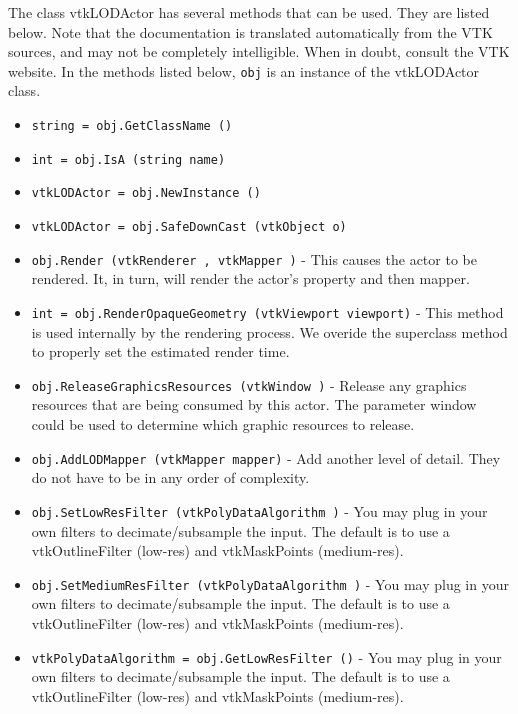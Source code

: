 The class vtkLODActor has several methods that can be used.
  They are listed below.
Note that the documentation is translated automatically from the VTK sources,
and may not be completely intelligible.  When in doubt, consult the VTK website.
In the methods listed below, \verb|obj| is an instance of the vtkLODActor class.
\begin{itemize}
\item  \verb|string = obj.GetClassName ()|

\item  \verb|int = obj.IsA (string name)|

\item  \verb|vtkLODActor = obj.NewInstance ()|

\item  \verb|vtkLODActor = obj.SafeDownCast (vtkObject o)|

\item  \verb|obj.Render (vtkRenderer , vtkMapper )| -  This causes the actor to be rendered. It, in turn, will render the actor's
 property and then mapper.  

\item  \verb|int = obj.RenderOpaqueGeometry (vtkViewport viewport)| -  This method is used internally by the rendering process. We overide 
 the superclass method to properly set the estimated render time.

\item  \verb|obj.ReleaseGraphicsResources (vtkWindow )| -  Release any graphics resources that are being consumed by this actor.
 The parameter window could be used to determine which graphic
 resources to release.

\item  \verb|obj.AddLODMapper (vtkMapper mapper)| -  Add another level of detail.  They do not have to be in any order
 of complexity.

\item  \verb|obj.SetLowResFilter (vtkPolyDataAlgorithm )| -  You may plug in your own filters to decimate/subsample the input. The
 default is to use a vtkOutlineFilter (low-res) and vtkMaskPoints 
 (medium-res).

\item  \verb|obj.SetMediumResFilter (vtkPolyDataAlgorithm )| -  You may plug in your own filters to decimate/subsample the input. The
 default is to use a vtkOutlineFilter (low-res) and vtkMaskPoints 
 (medium-res).

\item  \verb|vtkPolyDataAlgorithm = obj.GetLowResFilter ()| -  You may plug in your own filters to decimate/subsample the input. The
 default is to use a vtkOutlineFilter (low-res) and vtkMaskPoints 
 (medium-res).


\end{itemize}
